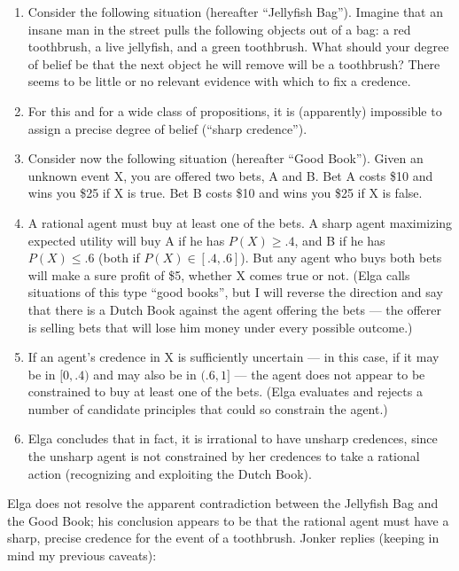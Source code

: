 \documentclass[letterpaper,12pt]{article}
\begin{document}
\begin{enumerate}
\item
Consider the following situation (hereafter ``Jellyfish Bag''). Imagine that an insane man in the street pulls the following objects out of a bag: a red toothbrush, a live jellyfish, and a green toothbrush. What should your degree of belief be that the next object he will remove will be a toothbrush? There seems to be little or no relevant evidence with which to fix a credence.
\item
For this and for a wide class of propositions, it is (apparently) impossible to assign a precise degree of belief (``sharp credence'').
\item
Consider now the following situation (hereafter ``Good Book''). Given an unknown event X, you are offered two bets, A and B. Bet A costs \$10 and wins you \$25 if X is true. Bet B costs \$10 and wins you \$25 if X is false.
\item
A rational agent must buy at least one of the bets. A sharp agent maximizing expected utility will buy A if he has $P(X) \geq .4$, and B if he has $P(X) \leq .6$ (both if $P(X) \in [.4, .6]$). But any agent who buys both bets will make a sure profit of \$5, whether X comes true or not. (Elga calls situations of this type ``good books'', but I will reverse the direction and say that there is a Dutch Book against the agent offering the bets --- the offerer is selling bets that will lose him money under every possible outcome.)
\item
If an agent's credence in X is sufficiently uncertain --- in this case, if it may be in $[0, .4)$ and may also be in $(.6, 1]$ --- the agent does not appear to be constrained to buy at least one of the bets. (Elga evaluates and rejects a number of candidate principles that could so constrain the agent.)
\item
Elga concludes that in fact, it is irrational to have unsharp credences, since the unsharp agent is not constrained by her credences to take a rational action (recognizing and exploiting the Dutch Book).
\end{enumerate}

Elga does not resolve the apparent contradiction between the Jellyfish Bag and the Good Book; his conclusion appears to be that the rational agent must have a sharp, precise credence for the event of a toothbrush. Jonker \citeyearpar{jonker2012} replies (keeping in mind my previous caveats):
\end{document}
